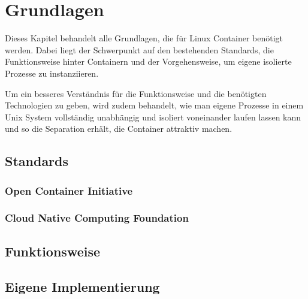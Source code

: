 \chapter{Grundlagen}
\label{chap:grundlagen}
Dieses Kapitel behandelt alle Grundlagen, die für Linux Container benötigt werden. Dabei liegt der Schwerpunkt auf den bestehenden Standards, die Funktionsweise hinter Containern und der Vorgehensweise, um eigene isolierte Prozesse zu instanziieren.

Um ein besseres Verständnis für die Funktionsweise und die benötigten Technologien zu geben, wird zudem behandelt, wie man eigene Prozesse in einem Unix System vollständig unabhängig und isoliert voneinander laufen lassen kann und so die Separation erhält, die Container attraktiv machen.
\section{Standards}
\label{sec:standards}
\subsection{Open Container Initiative}
\label{sec:oci}
\subsection{Cloud Native Computing Foundation}
\label{sec:cncf}
\section{Funktionsweise}
\label{sec:funktionsweise}
\section{Eigene Implementierung}
\label{eigeneImpl}